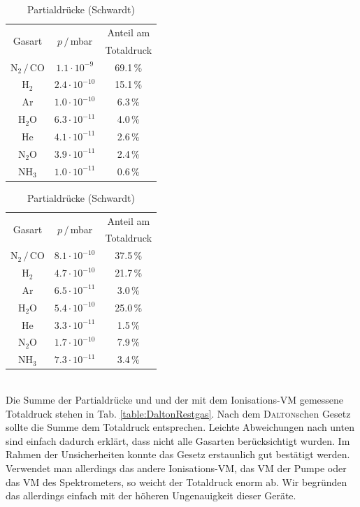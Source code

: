 \documentclass[german, parskip=full]{scrartcl}
\newcommand{\tecxt}{}
\begin{document}
\begin{table}[!htp]
\centering
\begin{minipage}{0.5\textwidth}
\centering
\begin{tabular}{c|c|c}
\multirow{2}{*}{Gasart}&\multirow{2}{*}{$p\,/\,$mbar}&Anteil am \\ &&Totaldruck\\ \hline
$\tecxt\text{N}_2\,/\,\tecxt\text{CO}$&$1.1\cdot 10^{-9}$&69.1\,\%\\ \hline
$\tecxt\text{H}_2$&$2.4\cdot 10^{-10}$&15.1\,\%\\ \hline
Ar&$1.0\cdot 10^{-10}$&6.3\,\%\\ \hline
$\tecxt\text{H}_2\tecxt\text{O}$&$6.3\cdot 10^{-11}$&4.0\,\%\\ \hline
$\tecxt\text{He}$&$4.1\cdot 10^{-11}$&2.6\,\%\\ \hline
$\tecxt\text{N}_2\tecxt\text{O}$&$3.9\cdot 10^{-11}$&2.4\,\%\\ \hline
$\tecxt\text{NH}_3$&$1.0\cdot 10^{-11}$&0.6\,\%\\
\end{tabular}
\caption{Partialdrücke (Romstedt)}
\label{table:RestgasspektrumPartialRomstedt}
\end{minipage}%
\begin{minipage}{0.5\textwidth}
\centering
\begin{tabular}{c|c|c}
\multirow{2}{*}{Gasart}&\multirow{2}{*}{$p\,/\,$mbar}&Anteil am \\ &&Totaldruck\\ \hline
$\tecxt\text{N}_2\,/\,\tecxt\text{CO}$&$8.1\cdot 10^{-10}$&37.5\,\%\\ \hline
$\tecxt\text{H}_2$&$4.7\cdot 10^{-10}$&21.7\,\%\\ \hline
Ar&$6.5\cdot 10^{-11}$&3.0\,\%\\ \hline
$\tecxt\text{H}_2\tecxt\text{O}$&$5.4\cdot 10^{-10}$&25.0\,\%\\ \hline
$\tecxt\text{He}$&$3.3\cdot 10^{-11}$&1.5\,\%\\ \hline
$\tecxt\text{N}_2\tecxt\text{O}$&$1.7\cdot 10^{-10}$&7.9\,\%\\ \hline
$\tecxt\text{NH}_3$&$7.3\cdot 10^{-11}$&3.4\,\%\\
\end{tabular}
\caption{Partialdrücke (Schwardt)}
\label{table:RestgasspektrumPartialSchwardt}
\end{minipage}
\end{table}\\
Die Summe der Partialdrücke und und der mit dem Ionisations-VM gemessene Totaldruck stehen in Tab. \ref{table:DaltonRestgas}. Nach dem \textsc{Dalton}schen Gesetz sollte die Summe dem Totaldruck entsprechen. Leichte Abweichungen nach unten sind einfach dadurch erklärt, dass nicht alle Gasarten berücksichtigt wurden. Im Rahmen der Unsicherheiten konnte das Gesetz erstaunlich gut bestätigt werden. Verwendet man allerdings das andere Ionisations-VM, das VM der Pumpe oder das VM des Spektrometers, so weicht der Totaldruck enorm ab. Wir begründen das allerdings einfach mit der höheren Ungenauigkeit dieser Geräte.
\end{document}
